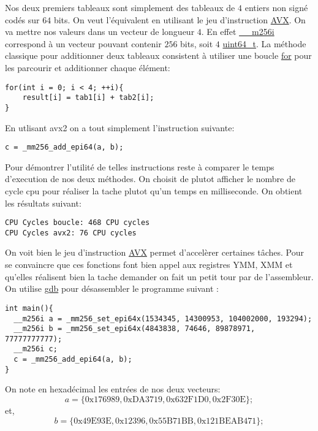\documentclass[12pt]{article}
\begin{document}
Nos deux premiers tableaux sont simplement des tableaux de $4$ entiers non signé codés sur $64$ bits. On veut l'équivalent en utilisant le jeu d'instruction \url{AVX}. On va mettre nos valeurs dans un vecteur de longueur $4$. En effet \url{__m256i} correspond à un vecteur pouvant contenir $256$ bits, soit $4$ \url{uint64_t}.
La méthode classique pour additionner deux tableaux consistent à utiliser une boucle \url{for} pour les parcourir et additionner chaque élément:
\medskip
\begin{lstlisting}[style = Cstyle]
for(int i = 0; i < 4; ++i){
    result[i] = tab1[i] + tab2[i];
}
\end{lstlisting}
\vspace{1cm}
En utlisant avx2 on a tout simplement l'instruction suivante:
\medskip
\begin{lstlisting}[style = Cstyle]
c = _mm256_add_epi64(a, b);
\end{lstlisting}
\vspace{1cm}
Pour démontrer l'utilité de telles instructions reste à comparer le temps d'execution de nos deux méthodes. On choisit de plutot afficher le nombre de cycle cpu pour réaliser la tache plutot qu'un temps en milliseconde. On obtient les résultats suivant:
\begin{lstlisting}
CPU Cycles boucle: 468 CPU cycles
CPU Cycles avx2: 76 CPU cycles
\end{lstlisting}
On voit bien le jeu d'instruction \url{AVX} permet d'accelèrer certaines tâches.
\newline
Pour se convaincre que ces fonctions font bien appel aux registres YMM, XMM et qu'elles réalisent bien la tache demander on fait un petit tour par de l'assembleur. On utilise \url{gdb} pour désassembler le programme suivant :
\vspace{1cm}
\begin{lstlisting}[style=CStyle]
int main(){
  __m256i a = _mm256_set_epi64x(1534345, 14300953, 104002000, 193294);
  __m256i b = _mm256_set_epi64x(4843838, 74646, 89878971, 77777777777);
  __m256i c;
  c = _mm256_add_epi64(a, b);
}
\end{lstlisting}
\vspace{1cm}
On note en hexadécimal les entrées de nos deux vecteurs:
$$a=\{0\mathrm{x}176989, 0\mathrm{xDA}3719, 0\mathrm{x}632\mathrm{F}1\mathrm{D}0, 0\mathrm{x}2\mathrm{F}30\mathrm{E} \};$$
et,
$$b=\{0\mathrm{x}49\mathrm{E}93\mathrm{E}, 0\mathrm{x}12396, 0\mathrm{x}55\mathrm{B}71\mathrm{BB}, 0\mathrm{x}121\mathrm{BEAB}471\};$$
\end{document}
